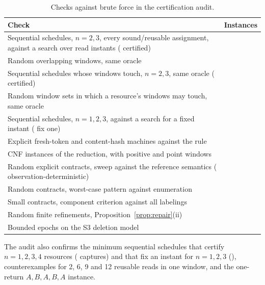 \begin{table}[t]
\caption{Checks against brute force in the certification audit.}
\label{tab:audit}
\small
\begin{tabularx}{\columnwidth}{@{}Xr@{}}
\toprule
Check & Instances \\
\midrule
Sequential schedules, $n=2,3$, every sound/reusable assignment, against a
search over read instants (\sScheduleCertified{} certified) & \sScheduleChecks{} \\
Random overlapping windows, same oracle & \sWindowChecks{} \\
Sequential schedules whose windows touch, $n=2,3$, same oracle
(\sTouchingCertified{} certified) & \sTouchingChecks{} \\
Random window sets in which a resource's windows may touch, same oracle &
\sTouchingRandom{} \\
Sequential schedules, $n=1,2,3$, against a search for a fixed instant
(\sFixedCertified{} fix one) & \sFixedChecks{} \\
Explicit fresh-token and content-hash machines against the rule & \sMachineChecks{} \\
CNF instances of the reduction, with positive and point windows & \sCnfChecks{} \\
Random explicit contracts, sweep against the reference semantics
(\sSweepDeterministic{} observation-deterministic) & \sSweepChecks{} \\
Random contracts, worst-case pattern against enumeration & \sPatternChecks{} \\
Small contracts, component criterion against all labelings & \sRepairChecks{} \\
Random finite refinements, Proposition~\ref{prop:repair}(ii) & \sRefinementChecks{} \\
Bounded epochs on the S3 deletion model & \sEpochChecks{} \\
\bottomrule
\end{tabularx}
\end{table}

The audit also confirms the minimum sequential schedules that certify $n=1,2,3,4$
resources (\sMinimumCaptures{} captures) and that fix an instant for
$n=1,2,3$ (\sMinimumFixed{}), counterexamples for 2, 6, 9 and 12 reusable reads
in one window, and the one-return $A,B,A,B,A$ instance.
